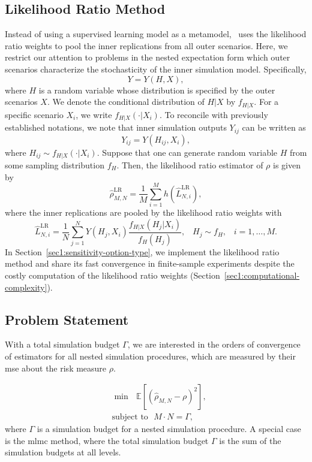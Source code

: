\subsection{Likelihood Ratio Method}

Instead of using a supervised learning model as a metamodel,~\cite{zhang2022sample} uses the likelihood ratio weights to pool the inner replications from all outer scenarios.
Here, we restrict our attention to problems in the nested expectation form which outer scenarios characterize the stochasticity of the inner simulation model. 
Specifically,
$$ Y = Y(H, X), $$
where $H$ is a random variable whose distribution is specified by the outer scenarios $X$. 
We denote the conditional distribution of $H|X$ by $f_{H|X}$. 
For a specific scenario $X_i$, we write $f_{H|X}(\cdot |X_i)$. 
To reconcile with previously established notations, we note that inner simulation outputs $Y_{ij}$ can be written as
$$ Y_{ij} = Y(H_{ij}, X_i), $$
where $H_{ij} \sim f_{H|X}(\cdot |X_i)$.
Suppose that one can generate random variable $H$ from some sampling
distribution $f_H$. Then, the likelihood ratio estimator of $\rho$ is given by
$$\hat{\rho}^{\text{LR}}_{M,N} = \frac{1}{M} \sum_{i=1}^M h(\hat{L}^{\text{LR}}_{N, i}), $$ where the inner replications are pooled by the likelihood ratio weights with
$$\hat{L}^{\text{LR}}_{N, i} = \frac{1}{N} \sum_{j=1}^N Y(H_j, X_i) \frac{f_{H|X}(H_{j}|X_i)}{f_H(H_{j})}, \;\;\; H_j \sim f_H, \;\;\; i=1, \dots, M.$$
In Section~\ref{sec1:sensitivity-option-type}, we implement the likelihood ratio method and share its fast convergence in finite-sample experiments despite the costly computation of the likelihood ratio weights (Section~\ref{sec1:computational-complexity}).

\subsection{Problem Statement}

With a total simulation budget $\Gamma$, we are interested in the orders of convergence of estimators for all nested simulation procedures, which are measured by their \gls{mse} about the risk measure $\rho$.

\begin{align}
    & \min ~~~ \mathbb{E} \left[ \left( \hat{\rho}_{M, N} - \rho \right)^2 \right], \nonumber \\
    & \text{subject to} ~~~ M \cdot N = \Gamma, 
\end{align}
where $\Gamma$ is a simulation budget for a nested simulation procedure.
A special case is the \gls{mlmc} method, where the total simulation budget $\Gamma$ is the sum of the simulation budgets at all levels.

